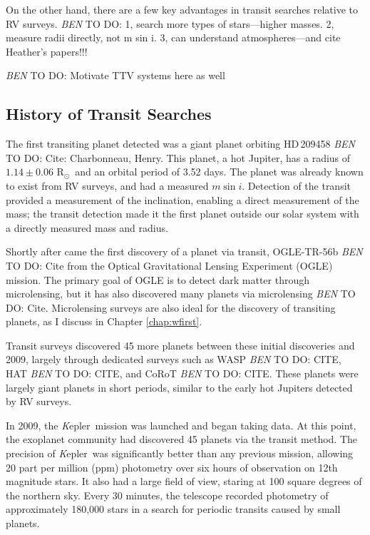\documentclass[12pt]{caltech_thesis}
\newcommand{\todo}[3]{{\color{#2} \emph{#1} TO DO: #3}}
\newcommand{\btmtodo}[1]{\todo{BEN}{red}{#1}}
\newcommand{\rsun}{{R$_\odot$}}
\newcommand{\kep}{{\textit Kepler}}
\begin{document}
On the other hand, there are a few key advantages in transit searches relative to 
RV surveys. 
\btmtodo{1, search more types of stars---higher masses. 2, measure radii directly,
not m sin i. 3, can understand atmospheres---and cite Heather's papers!!!}


\btmtodo{Motivate TTV systems here as well}


\subsection{History of Transit Searches}
The first transiting planet detected was a giant planet orbiting HD\,209458 
\btmtodo{Cite: Charbonneau, Henry}. 
This planet, a hot Jupiter, has a radius of $1.14 \pm 0.06$ \rsun\ and an orbital 
period of 3.52 days.
The planet was already known to exist from RV surveys, and had a measured $m \sin i$.
Detection of the transit provided a measurement of the inclination, enabling a 
direct measurement of the mass; the transit detection made it the first planet outside our solar system with a directly measured mass and radius.

Shortly after came the first discovery of a planet via transit, OGLE-TR-56b \btmtodo{Cite} from the Optical Gravitational Lensing Experiment (OGLE) mission.
The primary goal of OGLE is to detect dark matter through microlensing, but it has also discovered 
many planets via microlensing \btmtodo{Cite}.
Microlensing surveys are also ideal for the discovery of transiting planets, as 
I discuss in Chapter \ref{chap:wfirst}.

Transit surveys discovered 45 more planets between these initial discoveries and 2009, largely through dedicated surveys such as WASP \btmtodo{CITE}, HAT \btmtodo{CITE}, and
CoRoT \btmtodo{CITE}.
These planets were largely giant planets in short periods, similar to the early hot Jupiters
detected by RV surveys. 

In 2009, the \kep\ mission \citep{Borucki10} was launched and began taking data.
At this point, the exoplanet community had discovered 45 planets via the transit
method.
The precision of \kep\ was significantly better than any previous mission, allowing
20 part per million (ppm) photometry over six hours of observation on 12th magnitude
stars. 
It also had a large field of view, staring at 100 square degrees of the northern sky.
Every 30 minutes, the telescope recorded photometry of approximately 180,000 stars in a
search for periodic transits caused by small planets.
\end{document}
